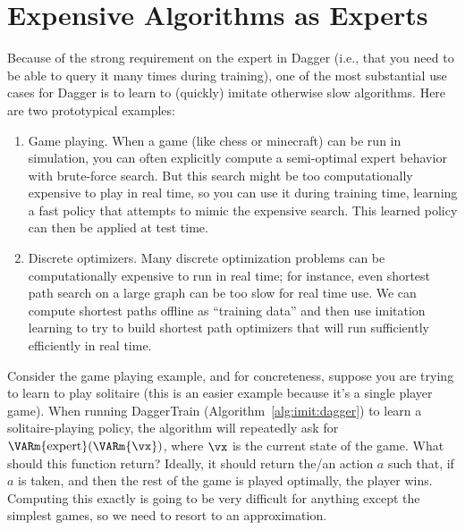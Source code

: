 \section{Expensive Algorithms as Experts}

Because of the strong requirement on the expert in Dagger (i.e., that you need to be able to query it many times during training), one of the most substantial use cases for Dagger is to learn to (quickly) imitate otherwise slow algorithms.
Here are two prototypical examples:
\begin{enumerate}
\item Game playing. When a game (like chess or minecraft) can be run in simulation, you can often explicitly compute a semi-optimal expert behavior with brute-force search. But this search might be too computationally expensive to play in real time, so you can use it during training time, learning a fast policy that attempts to mimic the expensive search. This learned policy can then be applied at test time.

\item Discrete optimizers. Many discrete optimization problems can be computationally expensive to run in real time; for instance, even shortest path search on a large graph can be too slow for real time use. We can compute shortest paths offline as ``training data'' and then use imitation learning to try to build shortest path optimizers that will run sufficiently efficiently in real time.
\end{enumerate}

Consider the game playing example, and for concreteness, suppose you are trying to learn to play solitaire (this is an easier example because it's a single player game).
When running DaggerTrain (Algorithm~\ref{alg:imit:dagger}) to learn a solitaire-playing policy, the algorithm will repeatedly ask for $\VARm{\text{expert}}(\VARm{\vx})$, where $\vx$ is the current state of the game.
What should this function return?
Ideally, it should return the/an action $a$ such that, if $a$ is taken, and then the rest of the game is played optimally, the player wins.
Computing this exactly is going to be very difficult for anything except the simplest games, so we need to resort to an approximation.

